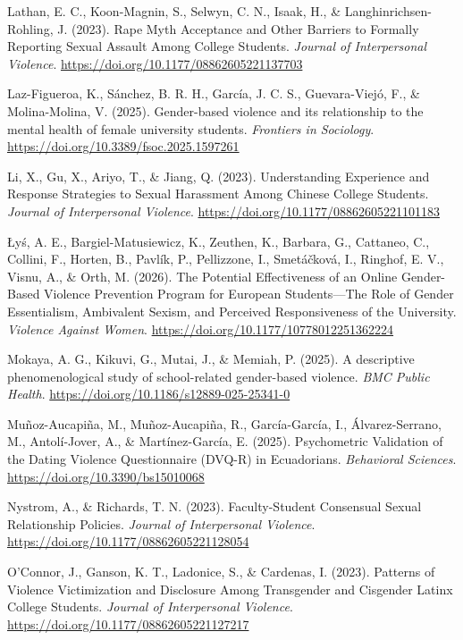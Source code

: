\documentclass[
  spanish,
  11pt,
  letterpaper,
  DIV=11,
  numbers=noendperiod]{scrreprt}
\newlength{\cslhangindent}
\newenvironment{CSLReferences}[2] %
 {\begin{list}{}{%
  \setlength{\itemindent}{0pt}
  \setlength{\leftmargin}{0pt}
  \setlength{\parsep}{0pt}
  \ifodd #1
   \setlength{\leftmargin}{\cslhangindent}
   \setlength{\itemindent}{-1\cslhangindent}
  \fi
  \setlength{\itemsep}{#2\baselineskip}}}
 {\end{list}}
\begin{document}
\begin{CSLReferences}{1}{0}
Lathan, E. C., Koon-Magnin, S., Selwyn, C. N., Isaak, H., \&
Langhinrichsen-Rohling, J. (2023). Rape Myth Acceptance and Other
Barriers to Formally Reporting Sexual Assault Among College Students.
\emph{Journal of Interpersonal Violence}.
\url{https://doi.org/10.1177/08862605221137703}

Laz-Figueroa, K., Sánchez, B. R. H., García, J. C. S., Guevara-Viejó,
F., \& Molina-Molina, V. (2025). Gender-based violence and its
relationship to the mental health of female university students.
\emph{Frontiers in Sociology}.
\url{https://doi.org/10.3389/fsoc.2025.1597261}

Li, X., Gu, X., Ariyo, T., \& Jiang, Q. (2023). Understanding Experience
and Response Strategies to Sexual Harassment Among Chinese College
Students. \emph{Journal of Interpersonal Violence}.
\url{https://doi.org/10.1177/08862605221101183}

Łyś, A. E., Bargiel-Matusiewicz, K., Zeuthen, K., Barbara, G., Cattaneo,
C., Collini, F., Horten, B., Pavlík, P., Pellizzone, I., Smetáčková, I.,
Ringhof, E. V., Visnu, A., \& Orth, M. (2026). The Potential
Effectiveness of an Online Gender-Based Violence Prevention Program for
European Students---The Role of Gender Essentialism, Ambivalent Sexism,
and Perceived Responsiveness of the University. \emph{Violence Against
Women}. \url{https://doi.org/10.1177/10778012251362224}

Mokaya, A. G., Kikuvi, G., Mutai, J., \& Memiah, P. (2025). A
descriptive phenomenological study of school-related gender-based
violence. \emph{BMC Public Health}.
\url{https://doi.org/10.1186/s12889-025-25341-0}

Muñoz-Aucapiña, M., Muñoz-Aucapiña, R., García-García, I.,
Álvarez-Serrano, M., Antolí-Jover, A., \& Martínez-García, E. (2025).
Psychometric Validation of the Dating Violence Questionnaire (DVQ-R) in
Ecuadorians. \emph{Behavioral Sciences}.
\url{https://doi.org/10.3390/bs15010068}

Nystrom, A., \& Richards, T. N. (2023). Faculty-Student Consensual
Sexual Relationship Policies. \emph{Journal of Interpersonal Violence}.
\url{https://doi.org/10.1177/08862605221128054}

O'Connor, J., Ganson, K. T., Ladonice, S., \& Cardenas, I. (2023).
Patterns of Violence Victimization and Disclosure Among Transgender and
Cisgender Latinx College Students. \emph{Journal of Interpersonal
Violence}. \url{https://doi.org/10.1177/08862605221127217}


\end{CSLReferences}
\end{document}
